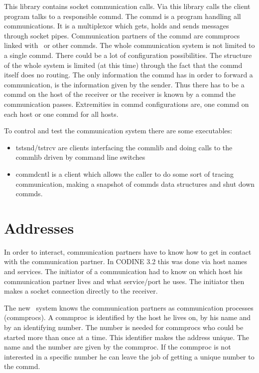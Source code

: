 This library contains socket communication calls. Via this library calls
the client program talks to a responsible commd. The commd is a program
handling all communications. It is a multiplexor which gets, holds and 
sends messages through socket pipes. Communication partners of the commd 
are commprocs linked with \CL\ or other commds. 
The whole communication system is not limited
to a single commd. There could be a lot of configuration possibilities.
The structure of the whole system is limited (at this time) through the
fact that the commd itself does no routing. The only information the commd
has in order to forward a communication, is the information given by the 
sender.
Thus there has to be a commd on the host of the receiver or the receiver is
known by a commd the communication passes. Extremities in commd 
configurations are, one commd on each host or one commd for all hosts.

To control and test the communication system there are some executables:
\begin{itemize}
\item tstsnd/tstrcv are clients interfacing the commlib and doing calls
to the commlib driven by command line switches
\item commdcntl is a client which allows the caller to do some sort of 
tracing communication, making a snapshot of commds data structures and shut
down commds.
\end{itemize}


\section{Addresses}
In order to interact, communication partners have to know how to get in
contact with the communication partner. In CODINE 3.2 this was done via
host names and services. The initiator of a communication had to know on
which host his communication partner lives and what service/port he uses.
The initiator then makes a socket connection directly to the receiver.

The new \co\ system knows the communication partners as communication 
processes (commprocs). A commproc is identified by the host he lives on,
by his name and by an identifying number. The number is needed for commprocs
who could be started more than once at a time. This identifier makes the 
address unique. The name and the number are given by the commproc. If the
commproc is not interested in a specific number he can leave the job of 
getting a unique number to the commd.

